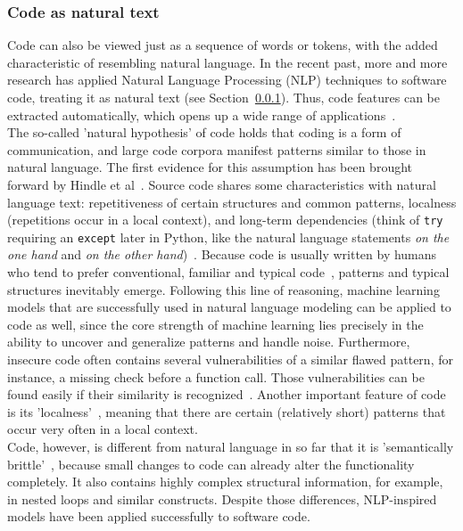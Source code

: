 \documentclass[
a4paper,
pagesize,
pdftex,
12pt,
twoside, %
BCOR=5mm, %
ngerman,
fleqn,
final,
]{scrartcl}
\begin{document}
	\subsubsection{Code as natural text}\label{Natural-Hypothesis}\label{Semantically-Brittle}
	Code can also be viewed just as a sequence of words or tokens, with the added characteristic of resembling natural language. In the recent past, more and more research has applied Natural Language Processing (NLP) techniques to software code, treating it as natural text (see Section~\ref{Natural-Hypothesis}). Thus, code features can be extracted automatically, which opens up a wide range of applications~\cite{Dam.2017}.\\
	The so-called 'natural hypothesis' of code holds that coding is a form of communication, and large code corpora manifest patterns similar to those in natural language. The first evidence for this assumption has been brought forward by Hindle et al~\cite{Hindle.2012}.
	Source code shares some characteristics with natural language text: repetitiveness of certain structures and common patterns, localness (repetitions occur in a local context), and long-term dependencies (think of \texttt{try} requiring an \texttt{except} later in Python, like the natural language statements \textit{on the one hand} and \textit{on the other hand})~\cite{Dam.2016}.
	Because code is usually written by humans who tend to prefer conventional, familiar and typical code~\cite{Allamanis.2018}, patterns and typical structures inevitably emerge. Following this line of reasoning, machine learning models that are successfully used in natural language modeling can be applied to code as well, since the core strength of machine learning lies precisely in the ability to uncover and generalize patterns and handle noise. Furthermore, insecure code often contains several vulnerabilities of a similar flawed pattern, for instance, a missing check before a function call. Those vulnerabilities can be found easily if their similarity is recognized~\cite{Yamaguchi.2012}. 
	Another important feature of code is its 'localness'~\cite{Tu.2014}, meaning that there are certain (relatively short) patterns that occur very often in a local context.\\ 
	Code, however, is different from natural language in so far that it is 'semantically brittle'~\cite{Allamanis.2018}, because small changes to code can already alter the functionality completely. It also contains highly complex structural information, for example, in nested loops and similar constructs. Despite those differences, NLP-inspired models have been applied successfully to software code.
	
\end{document}
